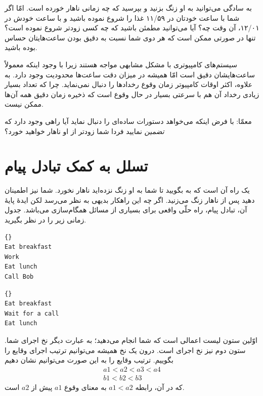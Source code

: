 \documentclass{book}
\newcommand{\clearemptydoublepage}{\newpage\cleardoublepage}
\begin{document}
    به سادگی می‌توانید به او زنگ بزنید و بپرسید که چه زمانی ناهار خورده است. امّا اگر شما با ساعت خودتان در ۱۱/۵۹ غذا را شروع نموده باشید 
    و  با ساعت خودش در ۱۲/۰۱، آن وقت چه؟ آیا می‌توانید مطمئن باشید که چه کسی زودتر شروع نموده است؟ 
    تنها در صورتی ممکن است که هر دوی شما نسبت به دقیق بودن ساعت‌هایتان حساس بوده باشید.

    سیستم‌های کامپیوتری با مشکل مشابهی مواجه هستند زیرا با وجود اینکه معمولاً ساعت‌هایشان دقیق است امّا همیشه 
    در میزان دقت ساعت‌ها محدودیت وجود دارد. به علاوه، اکثر اوقات کامپیوتر زمان وقوع رخدادها را دنبال نمی‌نماید. 
    چرا که تعداد بسیار زیادی رخداد آن هم با سرعتی بسیار در حال وقوع است که ذخیره  زمان دقیق همه آن‌ها ممکن نیست. 
    
    معمّا: با فرض اینکه  می‌خواهد دستورات ساده‌ای را دنبال نماید آیا راهی وجود دارد که \emph{تضمین} نمایید فردا شما زودتر از او ناهار خواهید خورد؟
    
\clearemptydoublepage
\section {تسلل به کمک تبادل پیام}
\label{serialization}

    یک راه آن است که به  بگویید تا شما به او زنگ نزده‌اید ناهار نخورد. شما نیز  اطمینان دهید پس از ناهار زنگ می‌زنید. 
    اگر چه این راهکار بدیهی به نظر می‌رسد لکن ایدهٔ پایهٔ آن، تبادل پیام، راه حلّی واقعی برای بسیاری
    از مسائل همگام‌سازی می‌باشد. جدول زمانی زیر را در نظر بگیرید. 
    
\begin{latin}
\begin{minipage}[t]{2in}
\begin{latin}
\begin{lstlisting}[title=\rl{نخ \lr{A} (شما)}]{}
Eat breakfast 
Work          
Eat lunch     
Call Bob
\end{lstlisting}
\end{latin}
\end{minipage}
\hfill
\begin{minipage}[t]{2in}
\begin{latin}
\begin{lstlisting}[title=\rl{نخ \lr{B} (‌Bob)}]{}
Eat breakfast
Wait for a call
Eat lunch
\end{lstlisting}
\end{latin}
\end{minipage}
\end{latin}
%
    اوّلین ستون لیست اعمالی است که شما انجام می‌دهید؛ به عبارت دیگر نخ اجرای شما. 
    ستون دوم نیز نخ اجرای  است. درون یک نخ همیشه می‌توانیم ترتیب اجرای وقایع را بگوییم. 
    ترتیب وقایع را به این صورت می‌توانیم نشان دهیم
%
\begin{eqnarray*}
a1 < a2 < a3 < a4  \\
b1 < b2 < b3
\end{eqnarray*}
%
    که در آن، رابطه  $a1 < a2$ به معنای وقوع  $a1$ پیش از  $a2$ است. 
\end{document}
